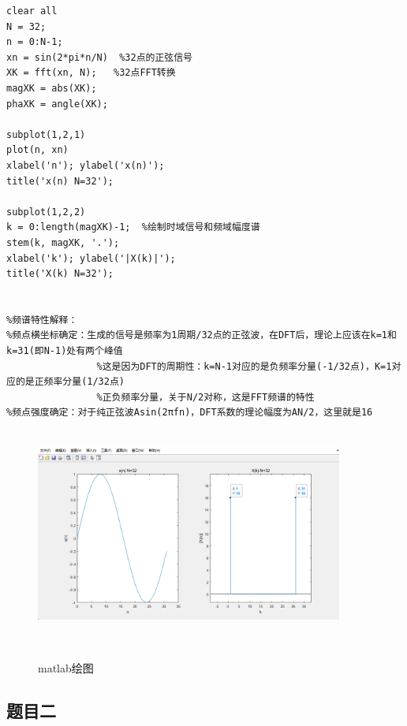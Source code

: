 \documentclass[12pt,hyperref,a4paper,UTF8]{ctexart}
\begin{document}
\begin{lstlisting}[style=matlab, caption={实验一MATLAB实现代码}]
clear all
N = 32;
n = 0:N-1;
xn = sin(2*pi*n/N)  %32点的正弦信号 
XK = fft(xn, N);   %32点FFT转换
magXK = abs(XK);
phaXK = angle(XK);

subplot(1,2,1)
plot(n, xn)
xlabel('n'); ylabel('x(n)');
title('x(n) N=32');

subplot(1,2,2)
k = 0:length(magXK)-1;  %绘制时域信号和频域幅度谱
stem(k, magXK, '.'); 
xlabel('k'); ylabel('|X(k)|');
title('X(k) N=32');


%频谱特性解释：
%频点横坐标确定：生成的信号是频率为1周期/32点的正弦波，在DFT后，理论上应该在k=1和k=31(即N-1)处有两个峰值
                %这是因为DFT的周期性：k=N-1对应的是负频率分量(-1/32点)，K=1对应的是正频率分量(1/32点)
                %正负频率分量，关于N/2对称，这是FFT频谱的特性
%频点强度确定：对于纯正弦波Asin(2πfn)，DFT系数的理论幅度为AN/2，这里就是16
\end{lstlisting}



\begin{figure}[H] %
        \centering
        \includegraphics[width=0.9\textwidth]{figures/301.png} %
        \caption{matlab绘图} %
        \label{fig:example} %
\end{figure}



\subsection{题目二}
\end{document}
